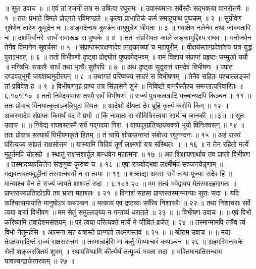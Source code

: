 ॥ सूत उवाच ॥ ॥
एवं तां रजनीं तत्र स उषित्वा रघूत्तमः ॥
उपास्यमानः सर्वैस्तैः सद्भक्त्या वानरोत्तमैः ॥ १ ॥
ततः प्रभाते विमले प्रोद्गते रविमण्डले ॥
कृत्वा प्राभातिकं कर्म समाहूयाथ पुष्पकम् ॥ २ ॥
सुग्रीवेण सुषेणेन तारेण कुमुदेन च ॥
अङ्गदेनाथ कुण्डेन वायुपुत्रेण धीमता ॥ ३ ॥
गवाक्षेण नलेनेव तथा जांबवतापि च ॥
दशभिर्वानरैः सार्धं समारूढः स पुष्पके ॥ ४ ॥
ततः संप्रस्थितः काले लङ्कामुद्दिश्य राघवः ॥
मनोजवेन तेनैव विमानेन सुवर्चसा ॥ ५ ॥
संप्राप्तस्तत्क्षणादेव लङ्काख्यां च महापुरीम् ॥
वीक्षयंस्तान्प्रदेशांश्च यत्र युद्धं पुराऽभवत् ॥ ६ ॥
ततो विभीषणो दृष्ट्वा प्रोद्द्योतं पुष्पकोद्भवम् ॥
रामं विज्ञाय संप्राप्तं प्रहृष्टः सम्मुखो ययौ ॥
मन्त्रिभिः सकलैः सार्धं तथा भृत्यैः सुतैरपि ॥ ७ ॥
अथ दृष्ट्वा सुदूरात्तं रामदेवं विभीषणः ॥
पपात दण्डवद्भूमौ जयशब्दमुदीरयन् ॥ ८ ॥
तथागतं परिष्वज्य सादरं स विभीषणम् ॥
तेनैव सहितः पश्चाल्लङ्कां तां प्रविवेश ह ॥ ९ ॥
विभीषणगृहं प्राप्य तत्र सिंहासने शुभे ॥
निविष्टो वानरैस्तैश्च समन्तात्परिवारितः ॥ ६.१०१.१० ॥
ततो निवेदयामास तस्मै सर्वं विभीषणः ॥
राज्यं पुत्रकलत्रादि यच्चान्यदपि किञ्चन ॥ ११ ॥
ततः प्रोवाच विनयात्कृताञ्जलिपुटः स्थितः ॥
आदेशो दीयतां देव ब्रूहि कृत्यं करोमि किम् ॥ १२ ॥
अकस्मादेव संप्राप्तः किमर्थं वद मे प्रभो ॥
किं नायातः स सौमित्रिस्त्वया सार्ध च जानकी ॥।३॥
॥ सूत उवाच ॥ ॥
निवेद्य राघवस्तस्मै सर्वं गद्गदया गिरा ॥
वाष्पपूरप्रतिच्छन्नवक्त्रो भूयो विनिःश्वसन् ॥ १४ ॥
ततः प्रोवाच सत्यार्थं विभीषणकृते हितम् ॥
तं चापि शोकसन्तप्तं संबोध्य रघुनन्दनः ॥ १५ ॥
अहं राज्यं परित्यज्य सांप्रतं राक्षसोत्तम ॥
यास्यामि त्रिदिवं तूर्णं लक्ष्मणो यत्र संस्थितः ॥ ॥ १६ ॥
न तेन रहितो मर्त्ये मुहूर्तमपि चोत्सहे ॥
स्थातुं राक्षसशार्दूल बान्धवेन महात्मना ॥ १७ ॥
अहं शिक्षापणार्थाय तव प्राप्तो विभीषण ॥
तस्मादव्यग्रचित्तेन संशृणुष्व कुरुष्व च ॥ १८ ॥
एषा राज्योद्भवा लक्ष्मीर्मदं सञ्जनयेन्नृणाम् ॥
मद्यवत्स्वल्पबुद्धीनां तस्मात्कार्यो न स त्वया ॥ १९ ॥
शक्राद्या अमराः सर्वे त्वया पूज्याः सदैव हि ॥
मान्याश्च येन ते राज्यं जायते शाश्वतं सदा । ६.१०१.२० ॥
मम सत्यं भवेद्वाक्य मेतस्मादहमागतः ॥
प्राप्तराज्यप्रतिष्ठोऽपि तव भ्राता महाबलः ॥ २१ ॥
विनाशं सहसा प्राप्तस्तस्मान्मान्याः सुराः सदा ॥
यदि कश्चित्समायाति मानुषोऽत्र कथञ्चन ॥
मत्काय एव द्रष्टव्यः सर्वैरेव निशाचरैः ॥ २२ ॥
तथा निशाचराः सर्वे त्वया वार्या विभीषण ॥
मम सेतुं समुल्लङ्घ्य न गन्तव्यं धरातले ॥ २३ ॥
॥ विभीषण उवाच ॥ ॥
एवं विभो करिष्यामि तवादेशमसंशयम् ॥
परं त्वया परित्यक्ते मर्त्ये मे जीवितं व्रजेत् ॥ २४ ॥
तस्मान्मामपि तत्रैव त्वं विभो नेतुमर्हसि ॥
आत्मना सह यत्रास्ते प्राग्गतो लक्ष्मणस्तव ॥ २५ ॥
॥ श्रीराम उवाच ॥ ॥
मया तेऽक्षयमादिष्टं राज्यं राक्षससत्तम ॥
तस्मान्नार्हसि मां कर्तुं मिथ्याचारं कथञ्चन ॥ २६ ॥
अहमस्मिन्स्वके सेतौ शङ्करत्रितयं शुभम् ॥
स्थापयिष्यामि कीर्त्यर्थं तत्पूज्यं भवता सदा ॥
भक्तिमान्प्रतिसन्धाय यावच्चन्द्रार्कतारकम् ॥ २७ ॥

